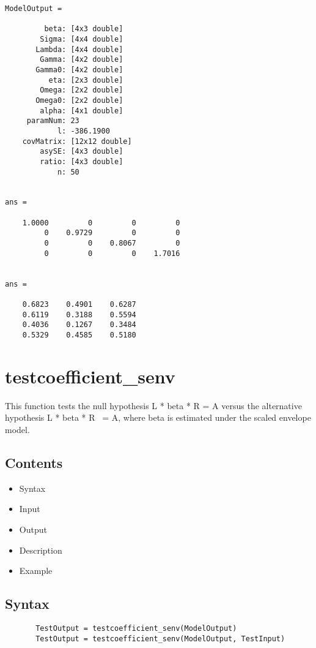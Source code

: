 \documentclass[a4paper,11pt,openany]{memoir}
\begin{document}
        \color{lightgray}\ttfamily \begin{verbatim}
ModelOutput = 

         beta: [4x3 double]
        Sigma: [4x4 double]
       Lambda: [4x4 double]
        Gamma: [4x2 double]
       Gamma0: [4x2 double]
          eta: [2x3 double]
        Omega: [2x2 double]
       Omega0: [2x2 double]
        alpha: [4x1 double]
     paramNum: 23
            l: -386.1900
    covMatrix: [12x12 double]
        asySE: [4x3 double]
        ratio: [4x3 double]
            n: 50


ans =

    1.0000         0         0         0
         0    0.9729         0         0
         0         0    0.8067         0
         0         0         0    1.7016


ans =

    0.6823    0.4901    0.6287
    0.6119    0.3188    0.5594
    0.4036    0.1267    0.3484
    0.5329    0.4585    0.5180

\end{verbatim} \rmfamily
\color{black}
\newpage

\rmfamily
\color{black}\section{testcoefficient\_senv}


This function tests the null hypothesis L * beta * R = A versus the
alternative hypothesis L * beta * R ~= A, where beta is estimated under
the scaled envelope model.
    
\subsection*{Contents}

\begin{itemize}
\setlength{\itemsep}{-1ex}
   \item Syntax
   \item Input
   \item Output
   \item Description
   \item Example
\end{itemize}


\subsection*{Syntax}


\begin{verbatim}       TestOutput = testcoefficient_senv(ModelOutput)
       TestOutput = testcoefficient_senv(ModelOutput, TestInput)\end{verbatim}
    
\end{document}
